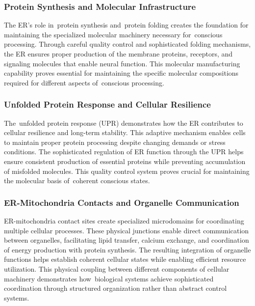 \subsubsection{Protein Synthesis and Molecular Infrastructure~~}

The ER's role in~protein synthesis and~protein folding creates the foundation for maintaining the specialized molecular machinery necessary for~conscious processing. Through careful quality control and sophisticated folding mechanisms, the ER ensures proper production of the membrane proteins, receptors, and signaling molecules that enable neural function. This molecular manufacturing capability proves essential for maintaining the specific molecular compositions required for different aspects of~conscious processing.

\subsubsection{Unfolded Protein Response and Cellular Resilience~~}

The~unfolded protein response (UPR) demonstrates how the ER contributes to cellular resilience and long-term stability. This adaptive mechanism enables cells to maintain proper protein processing despite changing demands or stress conditions. The sophisticated regulation of ER function through the UPR helps ensure consistent production of essential proteins while preventing accumulation of misfolded molecules. This quality control system proves crucial for maintaining the molecular basis of~coherent conscious states.

\subsubsection{ER-Mitochondria Contacts and Organelle Communication~~}

ER-mitochondria contact sites create specialized microdomains for coordinating multiple cellular processes. These physical junctions enable direct communication between organelles, facilitating lipid transfer, calcium exchange, and coordination of energy production with protein synthesis. The resulting integration of organelle functions helps establish coherent cellular states while enabling efficient resource utilization. This physical coupling between different components of cellular machinery demonstrates how~biological systems achieve sophisticated coordination through structured organization rather than abstract control systems.

